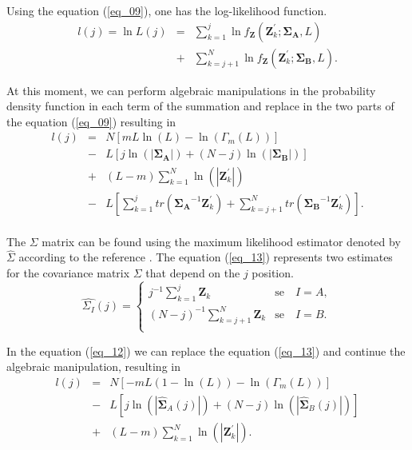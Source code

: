 \documentclass[conference]{IEEEtran}
\begin{document}
{{{{Using the equation (\ref{eq_09}), one has the log-likelihood function.
\begin{equation}
\begin{array}{rcl}\label{eq_11}
	l(j)=\ln L(j)&=&\sum_{k=1}^{j}\ln f_{\mathbf{Z}}(\mathbf{Z}_{k}^{'};\mathbf{\Sigma_{A}},L)\\
	             &+&\sum_{k=j+1}^{N}\ln f_{\mathbf{Z}}(\mathbf{Z}_{k}^{'};\mathbf{\Sigma_{B}},L).
\end{array}
\end{equation}

At this moment, we can perform algebraic manipulations in the probability density function in each term of the summation and replace in the two parts of the equation (\ref{eq_09}) resulting in
\begin{equation}
\begin{array}{lll}\label{eq_12}
	l(j)&=&N\left[mL\ln{\left(L\right)}-\ln{\left(\Gamma_m(L)\right)}\right]\\
	&-& L\left[j\ln{\left(|\mathbf{\Sigma_{A}}|\right)}+(N-j)\ln{\left(|\mathbf{\Sigma_{B}}|\right)}\right] \\
	&+&(L-m)\sum_{k=1}^{N}\ln{\left(|\mathbf{Z}_{k}^{'}|\right)}\\
	&-&L\left[\sum_{k=1}^{j}tr(\mathbf{\Sigma_{A}}^{-1}\mathbf{Z}_{k}^{'})+ \sum_{k=j+1}^{N}tr(\mathbf{\Sigma_{B}}^{-1}\mathbf{Z}_{k}^{'})\right]. \\
\end{array}
\end{equation}

The $\Sigma$ matrix can be found using the maximum likelihood estimator denoted by $\widehat{\Sigma}$ according to the reference \cite{good}. The equation (\ref{eq_13}) represents two estimates for the covariance matrix $\Sigma$ that depend on the $j$ position.
\begin{equation}\label{eq_13}
\widehat{\Sigma_{I}}(j) = \left\{
\begin{array}{lc}
	j^{-1}\sum_{k=1}^{j}\mathbf{Z}_{k}  & \mbox{se}\quad I=A,  \\
        (N-j)^{-1}\sum_{k=j+1}^{N}\mathbf{Z}_{k} & \mbox{se}\quad I=B. \\
\end{array}
\right.
\end{equation}

In the equation (\ref{eq_12}) we can replace the equation (\ref{eq_13}) and continue the algebraic manipulation, resulting in 
\begin{equation}\label{eq_14}
\begin{array}{rcl}
	l(j)&=&N\left[-mL(1-\ln{\left(L\right)})-\ln{\left(\Gamma_m(L)\right)}\right]\\
	&-&L\left[j\ln{\left(|\mathbf{\widehat{\Sigma}}_{A}(j)|\right)} +(N-j)\ln{\left(|\mathbf{\widehat{\Sigma}}_{B}(j)|\right)}\right]\\
	&+&(L-m)\sum_{k=1}^{N}\ln{\left(|\mathbf{Z}_{k}^{'}|\right)}. \\
\end{array}
\end{equation}

}}}}
\end{document}
